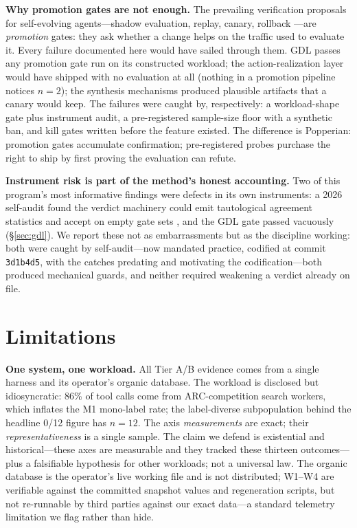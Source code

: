 \documentclass[11pt]{article}
\begin{document}
\textbf{Why promotion gates are not enough.} The prevailing verification proposals for self-evolving agents---shadow evaluation, replay, canary, rollback \citep{areal2026}---are \emph{promotion} gates: they ask whether a change helps on the traffic used to evaluate it. Every failure documented here would have sailed through them. GDL passes any promotion gate run on its constructed workload; the action-realization layer would have shipped with no evaluation at all (nothing in a promotion pipeline notices $n{=}2$); the synthesis mechanisms produced plausible artifacts that a canary would keep. The failures were caught by, respectively: a workload-shape gate plus instrument audit, a pre-registered sample-size floor with a synthetic ban, and kill gates written before the feature existed. The difference is Popperian: promotion gates accumulate confirmation; pre-registered probes purchase the right to ship by first proving the evaluation can refute.

\textbf{Instrument risk is part of the method's honest accounting.} Two of this program's most informative findings were defects in its own instruments: a 2026 self-audit found the verdict machinery could emit tautological agreement statistics and accept on empty gate sets \citep{canivel2026plasticity}, and the GDL gate passed vacuously (\S\ref{sec:gdl}). We report these not as embarrassments but as the discipline working: both were caught by self-audit---now mandated practice, codified at commit \texttt{3d1b4d5}, with the catches predating and motivating the codification---both produced mechanical guards, and neither required weakening a verdict already on file.

\section{Limitations}
\label{sec:limits}

\textbf{One system, one workload.} All Tier A/B evidence comes from a single harness and its operator's organic database. The workload is disclosed but idiosyncratic: 86\% of tool calls come from ARC-competition search workers, which inflates the M1 mono-label rate; the label-diverse subpopulation behind the headline 0/12 figure has $n{=}12$. The axis \emph{measurements} are exact; their \emph{representativeness} is a single sample. The claim we defend is existential and historical---these axes are measurable and they tracked these thirteen outcomes---plus a falsifiable hypothesis for other workloads; not a universal law. The organic database is the operator's live working file and is not distributed; W1--W4 are verifiable against the committed snapshot values and regeneration scripts, but not re-runnable by third parties against our exact data---a standard telemetry limitation we flag rather than hide.
\end{document}
